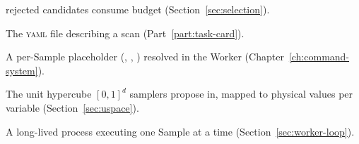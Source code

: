 \begin{description}[style=nextline, leftmargin=1.2em]
        rejected candidates consume budget (Section~\ref{sec:selection}).
  \item[task card] The \textsc{yaml} file describing a scan
        (Part~\ref{part:task-card}).
  \item[token] A per-Sample placeholder (, ,
        ) resolved in the Worker (Chapter~\ref{ch:command-system}).
  \item[u-space] The unit hypercube $[0,1]^d$ samplers propose in, mapped to physical
        values per variable (Section~\ref{sec:uspace}).
  \item[Worker] A long-lived process executing one Sample at a time
        (Section~\ref{sec:worker-loop}).
\end{description}
